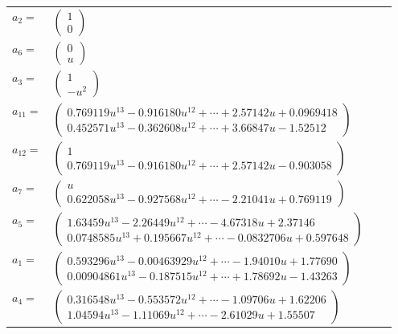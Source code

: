 \documentclass[1p]{elsarticle_modified}
\theoremstyle{definition}
\begin{document}
\begin{tabular}{m{7pt} m{180pt} m{7pt} m{180pt} }
\flushright $a_{2}=$&$\begin{pmatrix}1\\0\end{pmatrix}$ \\
\flushright $a_{6}=$&$\begin{pmatrix}0\\u\end{pmatrix}$ \\
\flushright $a_{3}=$&$\begin{pmatrix}1\\- u^2\end{pmatrix}$ \\
\flushright $a_{11}=$&$\begin{pmatrix}0.769119 u^{13}-0.916180 u^{12}+\cdots+2.57142 u+0.0969418\\0.452571 u^{13}-0.362608 u^{12}+\cdots+3.66847 u-1.52512\end{pmatrix}$ \\
\flushright $a_{12}=$&$\begin{pmatrix}1\\0.769119 u^{13}-0.916180 u^{12}+\cdots+2.57142 u-0.903058\end{pmatrix}$ \\
\flushright $a_{7}=$&$\begin{pmatrix}u\\0.622058 u^{13}-0.927568 u^{12}+\cdots-2.21041 u+0.769119\end{pmatrix}$ \\
\flushright $a_{5}=$&$\begin{pmatrix}1.63459 u^{13}-2.26449 u^{12}+\cdots-4.67318 u+2.37146\\0.0748585 u^{13}+0.195667 u^{12}+\cdots-0.0832706 u+0.597648\end{pmatrix}$ \\
\flushright $a_{1}=$&$\begin{pmatrix}0.593296 u^{13}-0.00463929 u^{12}+\cdots-1.94010 u+1.77690\\0.00904861 u^{13}-0.187515 u^{12}+\cdots+1.78692 u-1.43263\end{pmatrix}$ \\
\flushright $a_{4}=$&$\begin{pmatrix}0.316548 u^{13}-0.553572 u^{12}+\cdots-1.09706 u+1.62206\\1.04594 u^{13}-1.11069 u^{12}+\cdots-2.61029 u+1.55507\end{pmatrix}$ \\

\end{tabular}
\end{document}
